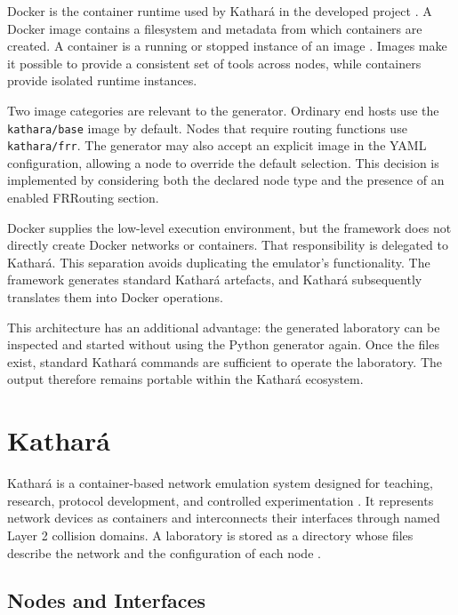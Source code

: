 Docker is the container runtime used by Kathar\'a in the developed project
\cite{docker_overview}. A Docker image contains a filesystem and metadata from
which containers are created. A container is a running or stopped instance of an image
\cite{docker_container,docker_image}. Images make it possible to provide a
consistent set of tools across nodes, while containers provide isolated
runtime instances.

Two image categories are relevant to the generator. Ordinary end hosts use the
\texttt{kathara/base} image by default. Nodes that require routing functions
use \texttt{kathara/frr}. The generator may also accept an explicit image in
the YAML configuration, allowing a node to override the default selection.
This decision is implemented by considering both the declared node type and
the presence of an enabled FRRouting section.

Docker supplies the low-level execution environment, but the framework does
not directly create Docker networks or containers. That responsibility is
delegated to Kathar\'a. This separation avoids duplicating the emulator's
functionality. The framework generates standard Kathar\'a artefacts, and
Kathar\'a subsequently translates them into Docker operations.

This architecture has an additional advantage: the generated laboratory can
be inspected and started without using the Python generator again. Once the
files exist, standard Kathar\'a commands are sufficient to operate the
laboratory. The output therefore remains portable within the Kathar\'a
ecosystem.

\section{Kathar\'a}
\label{sec:kathara}

Kathar\'a is a container-based network emulation system designed for teaching,
research, protocol development, and controlled experimentation
\cite{kathara_website,scazzariello2020kathara,bonofiglio2018kathara}. It represents network devices as
containers and interconnects their interfaces through named Layer 2 collision
domains. A laboratory is stored as a directory whose files describe the
network and the configuration of each node \cite{kathara_manpage}.

\subsection{Nodes and Interfaces}
\label{subsec:kathara-nodes-interfaces}

